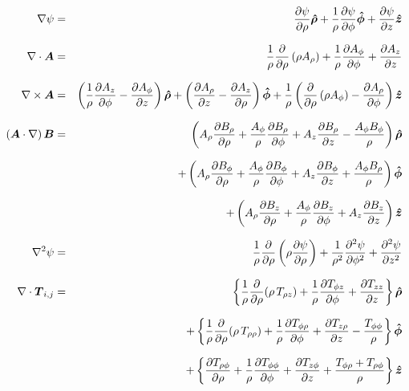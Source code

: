 \begin{eqnarray}
\nabla \psi &=& \frac{\partial\psi}{\partial \rho}\urh + \frac{1}{\rho}\frac{\partial\psi}{\partial \phi}\up 
              + \frac{\partial\psi}{\partial z}\uz \nonumnext
\nabla \cdot \vA &=& \frac{1}{\rho}\frac{\partial}{\partial \rho}\left( {\rho A_{\rho}} \right) 
                   + \frac{1}{\rho}\frac{\partial A_{\phi}}{\partial \phi} + \frac{\partial A_{z}}{\partial z} \nonumnext
\nabla \times \vA &=& \left( \frac{1}{\rho}\frac{\partial A_{z}}{\partial \phi} - \frac{\partial A_{\phi}}{\partial z} \right)\urh
                    + \left( \frac{\partial A_{\rho}}{\partial z} - \frac{\partial A_{z}}{\partial \rho} \right)\up
                    + \frac{1}{\rho}\left( \frac{\partial}{\partial \rho}\left( \rho A_{\phi} \right) 
                      - \frac{\partial A_{\rho}}{\partial \phi} \right)\uz \nonumnext
(\vA \cdot \nabla)\, \vB &=& \left( A_{\rho}\frac{\partial B_{\rho}}{\partial \rho} 
                                + \frac{A_{\phi}}{\rho}\frac{\partial B_{\rho}}{\partial \phi} 
                                + A_{z}\frac{\partial B_{\rho}}{\partial z} 
                                - \frac{A_{\phi}B_{\phi}}{\rho} \right) \urh   \nonumnext
                          &&+\left( A_{\rho}\frac{\partial B_{\phi}}{\partial \rho} 
                                + \frac{A_{\phi}}{\rho}\frac{\partial B_{\phi}}{\partial \phi} 
                                + A_{z}\frac{\partial B_{\phi}}{\partial z} 
                                + \frac{A_{\phi}B_{\rho}}{\rho} \right) \up  \nonumnext
                          &&+\left( A_{\rho}\frac{\partial B_{z}}{\partial \rho} 
                                + \frac{A_{\phi}}{\rho}\frac{\partial B_{z}}{\partial \phi} 
                                + A_{z}\frac{\partial B_{z}}{\partial z} \right) \uz \nonumnext
\nabla^{2}\psi &=& \frac{1}{\rho}\frac{\partial}{\partial \rho} \left( \rho \frac{\partial \psi}{\partial \rho} \right) 
                 + \frac{1}{\rho^{2}}\frac{\partial^{2} \psi}{\partial \phi^{2}} + \frac{\partial^{2} \psi}{\partial z^{2}} \nonumnext
\nabla \cdot \boldT_{i,j} &=& 
     \left\{ \frac{1}{\rho} \frac{\partial}{\partial \rho} (\rho\,T_{\rho z}) 
     + \frac{1}{\rho} \frac{\partial T_{\phi z}}{\partial \phi} + \frac{\partial T_{zz}}{\partial z}   \right\} \urh \nonumnext
    &&+\left\{ \frac{1}{\rho} \frac{\partial}{\partial \rho} (\rho\,T_{\rho \rho}) 
     + \frac{1}{\rho} \frac{\partial T_{\phi\rho}}{\partial \phi} + \frac{\partial T_{z \rho}}{\partial z} 
     - \frac{T_{\phi\phi}}{\rho} \right\} \up \nonumnext
    &&+\left\{ \frac{\partial T_{\rho \phi}}{\partial \rho} 
     + \frac{1}{\rho} \frac{\partial T_{\phi \phi}}{\partial \phi} + \frac{\partial T_{z\phi}}{\partial z} 
     + \frac{T_{\phi\rho} + T_{\rho\phi}}{\rho}  \right\} \uz \nonumber
\end{eqnarray}

